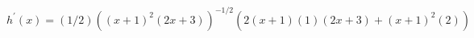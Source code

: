 $ \displaystyle h^{\prime}(x) = (1/2)((x+1)^2(2x+3))^{-1/2}\left(2(x+1)(1)(2x+3) + (x+1)^2(2)\right) $